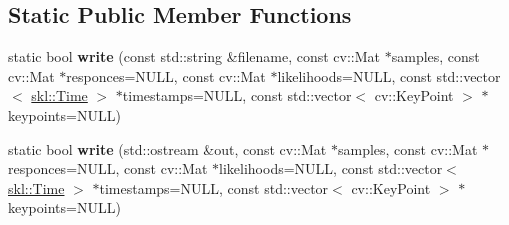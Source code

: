 \subsection*{Static Public Member Functions}
\begin{DoxyCompactItemize}
\item 
\hypertarget{classskl_1_1_sample_set_writer_a385f62f5d22e0a279400b82ee072ef14}{}\label{classskl_1_1_sample_set_writer_a385f62f5d22e0a279400b82ee072ef14} 
static bool {\bfseries write} (const std\+::string \&filename, const cv\+::\+Mat $\ast$samples, const cv\+::\+Mat $\ast$responces=N\+U\+LL, const cv\+::\+Mat $\ast$likelihoods=N\+U\+LL, const std\+::vector$<$ \hyperlink{classskl_1_1_time}{skl\+::\+Time} $>$ $\ast$timestamps=N\+U\+LL, const std\+::vector$<$ cv\+::\+Key\+Point $>$ $\ast$keypoints=N\+U\+LL)
\item 
\hypertarget{classskl_1_1_sample_set_writer_a469a25833c78729f864b656c42a6defd}{}\label{classskl_1_1_sample_set_writer_a469a25833c78729f864b656c42a6defd} 
static bool {\bfseries write} (std\+::ostream \&out, const cv\+::\+Mat $\ast$samples, const cv\+::\+Mat $\ast$responces=N\+U\+LL, const cv\+::\+Mat $\ast$likelihoods=N\+U\+LL, const std\+::vector$<$ \hyperlink{classskl_1_1_time}{skl\+::\+Time} $>$ $\ast$timestamps=N\+U\+LL, const std\+::vector$<$ cv\+::\+Key\+Point $>$ $\ast$keypoints=N\+U\+LL)
\end{DoxyCompactItemize}
